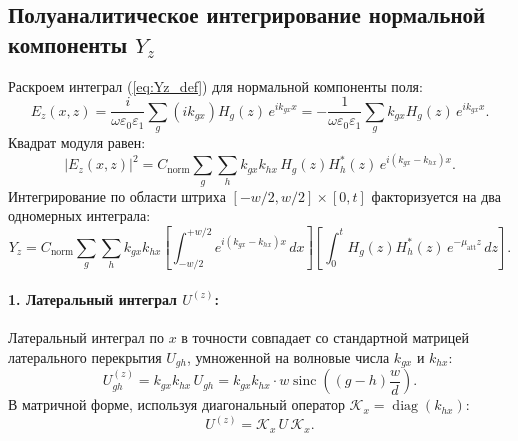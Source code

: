 \documentclass[a4paper,11pt]{article}
\begin{document}
\subsection{Полуаналитическое интегрирование нормальной компоненты \texorpdfstring{$Y_z$}{Yz}}

Раскроем интеграл (\ref{eq:Yz_def}) для нормальной компоненты поля:
\begin{equation}
    E_z(x, z) = \frac{i}{\omega \varepsilon_0 \varepsilon_1} \sum_g (i k_{gx}) H_g(z) \, e^{i k_{gx} x} = -\frac{1}{\omega \varepsilon_0 \varepsilon_1} \sum_g k_{gx} H_g(z) \, e^{i k_{gx} x}.
\end{equation}
Квадрат модуля равен:
\begin{equation}
    |E_z(x, z)|^2 = C_{\text{norm}} \sum_g \sum_h k_{gx} k_{hx} \, H_g(z) H_h^*(z) \, e^{i (k_{gx} - k_{hx}) x}.
\end{equation}
Интегрирование по области штриха $[-w/2, w/2] \times [0, t]$ факторизуется на два одномерных интеграла:
\begin{equation}
    Y_z = C_{\text{norm}} \sum_g \sum_h k_{gx} k_{hx} \left[ \int_{-w/2}^{+w/2} e^{i(k_{gx} - k_{hx})x} \, dx \right] \left[ \int_0^t H_g(z) H_h^*(z) \, e^{-\mu_{\text{att}} z} \, dz \right].
\end{equation}

\paragraph{1. Латеральный интеграл $U^{(z)}$:}
Латеральный интеграл по $x$ в точности совпадает со стандартной матрицей латерального перекрытия $U_{gh}$, умноженной на волновые числа $k_{gx}$ и $k_{hx}$:
\begin{equation}
    U_{gh}^{(z)} = k_{gx} k_{hx} \, U_{gh} = k_{gx} k_{hx} \cdot w \operatorname{sinc}\left( (g - h) \frac{w}{d} \right).
\end{equation}
В матричной форме, используя диагональный оператор $\mathcal{K}_x = \operatorname{diag}(k_{hx})$:
\begin{equation}
    U^{(z)} = \mathcal{K}_x \, U \, \mathcal{K}_x.
\end{equation}
\end{document}
